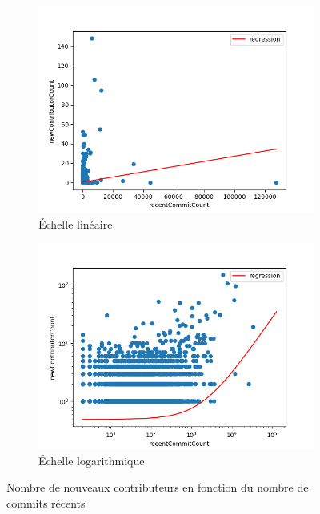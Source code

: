 \begin{figure}[ht]
    \centering
    \begin{subfigure}[t]{0.5\textwidth}
        \includegraphics[width=\textwidth]{experiment/data_analysis/recentCommitCountRegression_linearScale.png}
        \caption{Échelle linéaire}
    \end{subfigure}%
    \begin{subfigure}[t]{0.5\textwidth}
        \includegraphics[width=\textwidth]{experiment/data_analysis/recentCommitCountRegression_logScale.png}
        \caption{Échelle logarithmique}
    \end{subfigure}

    
    \caption{Nombre de nouveaux contributeurs en fonction du nombre de commits récents}
    \label{fig:commitCount}
\end{figure}

